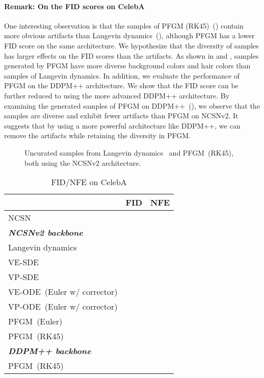 \paragraph{Remark: On the FID scores on CelebA } {One interesting observation is that the samples of PFGM (RK45)~() contain more obvious artifacts than Langevin dynamics~(), although PFGM has a lower FID score on the same architecture. We hypothesize that the diversity of samples has larger effects on the FID scores than the artifacts. As shown in  and , samples generated by PFGM have more diverse background colors and hair colors than samples of Langevin dynamics. In addition, we evaluate the performance of PFGM on the DDPM++ architecture. We show that the FID score can be further reduced to  using the more advanced DDPM++ architecture. By examining the generated samples of PFGM on DDPM++~(), we observe that the samples are diverse and exhibit fewer artifacts than PFGM on NCSNv2. It suggests that by using a more powerful architecture like DDPM++, we can remove the artifacts while retaining the diversity in PFGM.}




\begin{figure}[htbp]
    \centering
    \hfill
    \hfill
    \caption{Uncurated samples from Langevin dynamics~\cite{Song2019GenerativeMB} and PFGM~(RK45), both using the NCSNv2 architecture.}
    \label{fig:celeba_examine}
\end{figure}


\begin{table}[htbp]
\begin{center}
\caption{FID/NFE on CelebA }\label{tab:celeba}
\begin{tabular}{l c c}
\toprule
      &FID  & NFE \\
     \midrule
NCSN~\citep{Song2019GenerativeMB} &   & \\
     \midrule
    \textit{\textbf{NCSNv2 backbone}}\\
    \midrule
    Langevin dynamics~\citep{Song2020ImprovedTF} &   & \\
    VE-SDE~\citep{Song2021ScoreBasedGM} &  & \\
    VP-SDE~\citep{Song2021ScoreBasedGM} & & \\
    \midrule
VE-ODE~(Euler w/ corrector)  &   &  \\
    VP-ODE~(Euler w/ corrector)  &   &  \\
    PFGM~(Euler) &    &  \\
    PFGM~(RK45)&    &  \\
    \midrule
    \textit{\textbf{DDPM++ backbone}}\\
    \midrule
     PFGM~(RK45) &  & \\
     \bottomrule
\end{tabular}
\end{center}
\end{table}


